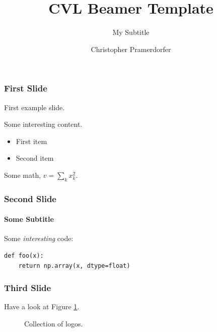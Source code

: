 \documentclass[xetex,professionalfont]{beamer}
\title{CVL Beamer Template}
\subtitle{My Subtitle}
\author{Christopher Pramerdorfer}
\institute{Computer Vision Lab, Vienna University of Technology}
\begin{document}

\begin{frame}
\maketitle
\end{frame}


\begin{frame}
\frametitle{First Slide}

First example slide.

Some interesting content.

\begin{itemize}
    \item First item
    \item Second item
\end{itemize}

Some math, $v=\sum_k x_k^2$.


\end{frame}

\begin{frame}[fragile]
\frametitle{Second Slide}
\framesubtitle{Some Subtitle}

Some \emph{interesting} code:

\begin{verbatim}
def foo(x):
    return np.array(x, dtype=float)
\end{verbatim}

\end{frame}


\begin{frame}
\frametitle{Third Slide}

Have a look at Figure \ref{fig:tuwcvl}.

\begin{figure}
\centering
{} 
\caption{Collection of logos.}
\label{fig:tuwcvl}
\end{figure}

\end{frame}
\end{document}
